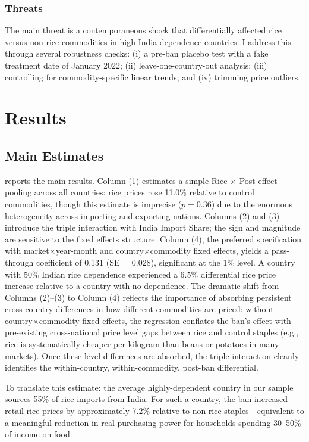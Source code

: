 \documentclass[12pt]{article}
\begin{document}
\subsubsection*{Threats} The main threat is a contemporaneous shock that differentially affected rice versus non-rice commodities in high-India-dependence countries. I address this through several robustness checks: (i) a pre-ban placebo test with a fake treatment date of January 2022; (ii) leave-one-country-out analysis; (iii) controlling for commodity-specific linear trends; and (iv) trimming price outliers.


\section{Results}

\subsection{Main Estimates}

 reports the main results. Column (1) estimates a simple Rice $\times$ Post effect pooling across all countries: rice prices rose 11.0\% relative to control commodities, though this estimate is imprecise ($p = 0.36$) due to the enormous heterogeneity across importing and exporting nations. Columns (2) and (3) introduce the triple interaction with India Import Share; the sign and magnitude are sensitive to the fixed effects structure. Column (4), the preferred specification with market$\times$year-month and country$\times$commodity fixed effects, yields a pass-through coefficient of 0.131 (SE = 0.028), significant at the 1\% level. A country with 50\% Indian rice dependence experienced a 6.5\% differential rice price increase relative to a country with no dependence. The dramatic shift from Columns (2)--(3) to Column (4) reflects the importance of absorbing persistent cross-country differences in how different commodities are priced: without country$\times$commodity fixed effects, the regression conflates the ban's effect with pre-existing cross-national price level gaps between rice and control staples (e.g., rice is systematically cheaper per kilogram than beans or potatoes in many markets). Once these level differences are absorbed, the triple interaction cleanly identifies the within-country, within-commodity, post-ban differential.



To translate this estimate: the average highly-dependent country in our sample sources 55\% of rice imports from India. For such a country, the ban increased retail rice prices by approximately 7.2\% relative to non-rice staples---equivalent to a meaningful reduction in real purchasing power for households spending 30--50\% of income on food.
\end{document}
